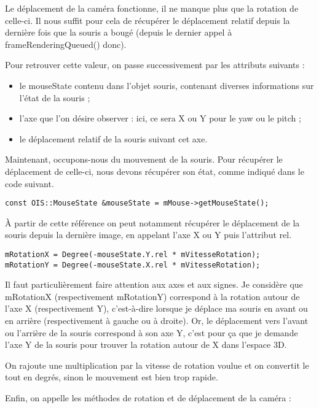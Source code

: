 \documentclass[10pt,a4paper]{report}
\begin{document}
Le d\'eplacement de la cam\'era fonctionne, il ne manque plus que la rotation de celle-ci. Il nous suffit pour cela de r\'ecup\'erer le d\'eplacement relatif depuis la derni\`ere fois que la souris a boug\'e (depuis le dernier appel \`a frameRenderingQueued() donc).

Pour retrouver cette valeur, on passe successivement par les attributs suivants :
\begin{itemize}
\item le mouseState contenu dans l'objet souris, contenant diverses informations sur l'\'etat de la souris ;
\item l'axe que l'on d\'esire observer : ici, ce sera X ou Y pour le yaw ou le pitch ;
\item le d\'eplacement relatif de la souris suivant cet axe.
\end{itemize}

Maintenant, occupons-nous du mouvement de la souris. Pour r\'ecup\'erer le d\'eplacement de celle-ci, nous devons r\'ecup\'erer son \'etat, comme indiqu\'e dans le code suivant.


\begin{lstlisting}[caption={}]
const OIS::MouseState &mouseState = mMouse->getMouseState();
\end{lstlisting}

\`A partir de cette r\'ef\'erence on peut notamment r\'ecup\'erer le d\'eplacement de la souris depuis la derni\`ere image, en appelant l'axe X ou Y puis l'attribut rel.


\begin{lstlisting}[caption={}]
mRotationX = Degree(-mouseState.Y.rel * mVitesseRotation);
mRotationY = Degree(-mouseState.X.rel * mVitesseRotation);
\end{lstlisting}

Il faut particuli\`erement faire attention aux axes et aux signes. Je consid\`ere que mRotationX (respectivement mRotationY) correspond \`a la rotation autour de l'axe X (respectivement Y), c'est-\`a-dire lorsque je d\'eplace ma souris en avant ou en arri\`ere (respectivement \`a gauche ou \`a droite). Or, le d\'eplacement vers l'avant ou l'arri\`ere de la souris correspond \`a son axe Y, c'est pour \c{c}a que je demande l'axe Y de la souris pour trouver la rotation autour de X dans l'espace 3D.

On rajoute une multiplication par la vitesse de rotation voulue et on convertit le tout en degr\'es, sinon le mouvement est bien trop rapide.

Enfin, on appelle les m\'ethodes de rotation et de d\'eplacement de la cam\'era :
\end{document}
